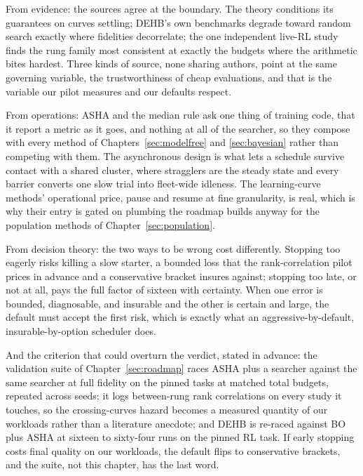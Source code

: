 From evidence: the sources agree at the boundary. The theory
conditions its guarantees on curves settling; DEHB's own benchmarks
degrade toward random search exactly where fidelities decorrelate;
the one independent live-RL study finds the rung family most
consistent at exactly the budgets where the arithmetic bites
hardest. Three kinds of source, none sharing authors, point at the
same governing variable, the trustworthiness of cheap evaluations,
and that is the variable our pilot measures and our defaults
respect.

From operations: ASHA and the median rule ask one thing of training
code, that it report a metric as it goes, and nothing at all of the
searcher, so they compose with every method of
Chapters~\ref{sec:modelfree} and \ref{sec:bayesian} rather than
competing with them. The asynchronous design is what lets a schedule
survive contact with a shared cluster, where stragglers are the
steady state and every barrier converts one slow trial into
fleet-wide idleness. The learning-curve methods' operational price,
pause and resume at fine granularity, is real, which is why their
entry is gated on plumbing the roadmap builds anyway for the
population methods of Chapter~\ref{sec:population}.

From decision theory: the two ways to be wrong cost differently.
Stopping too eagerly risks killing a slow starter, a bounded loss
that the rank-correlation pilot prices in advance and a conservative
bracket insures against; stopping too late, or not at all, pays the
full factor of sixteen with certainty. When one error is bounded,
diagnosable, and insurable and the other is certain and large, the
default must accept the first risk, which is exactly what an
aggressive-by-default, insurable-by-option scheduler does.

And the criterion that could overturn the verdict, stated in
advance: the validation suite of Chapter~\ref{sec:roadmap} races
ASHA plus a searcher against the same searcher at full fidelity on
the pinned tasks at matched total budgets, repeated across seeds; it
logs between-rung rank correlations on every study it touches, so
the crossing-curves hazard becomes a measured quantity of our
workloads rather than a literature anecdote; and DEHB is re-raced
against BO plus ASHA at sixteen to sixty-four runs on the pinned RL
task. If early stopping costs final quality on our workloads, the
default flips to conservative brackets, and the suite, not this
chapter, has the last word.

